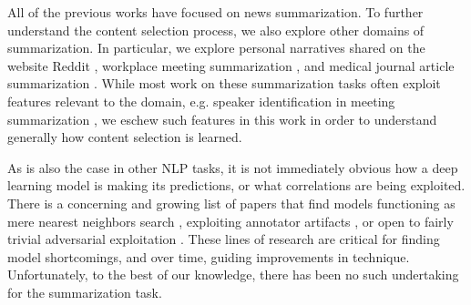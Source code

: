 All of the previous works have focused on news summarization. To further
understand the content selection process, we also explore other domains 
of summarization. In particular, we explore personal narratives shared
on the website Reddit \cite{ouyang2017crowd}, workplace meeting summarization
\cite{carletta2005ami}, and medical journal article summarization 
\cite{mishra2014text}. While most work on these summarization tasks
 often exploit 
features relevant
to the domain, e.g. speaker identification in meeting summarization \cite{gillick2009global},
we eschew such features in this work in order to understand generally how 
content
selection is learned.










%
%
%
%



As is also the case in other NLP tasks, it is not immediately obvious how a
deep learning model is making its predictions, or what correlations 
are being exploited. There is a concerning and growing list of papers that 
find models functioning as mere nearest neighbors search 
\cite{chen2016thorough}, 
exploiting annotator artifacts 
\cite{gururangan2018annotation}, or open to fairly trivial adversarial 
exploitation \cite{jia2017adversarial}. 
These lines of research are critical for finding model shortcomings, and over
time, guiding improvements in technique. Unfortunately,
to the best of our knowledge, there has been
no such undertaking for the summarization task. 

